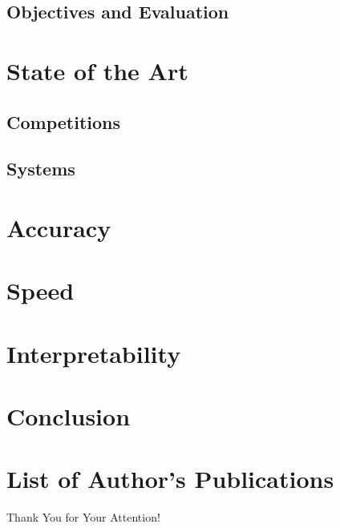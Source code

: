 \subsection{Objectives and Evaluation}
\begin{frame}[fragile]{\secname}
\end{frame}

\section{State of the Art}
\subsection{Competitions}
\begin{frame}[fragile]{\secname}
\end{frame}

\subsection{Systems}
\begin{frame}{\secname}
\end{frame}

\section{Accuracy}
\section{Speed}
\section{Interpretability}
\section{Conclusion}
\section{List of Author's Publications}

\begin{frame}[plain]
\vfill
\centerline{Thank You for Your Attention!}
\vfill\vfill
\end{frame}

